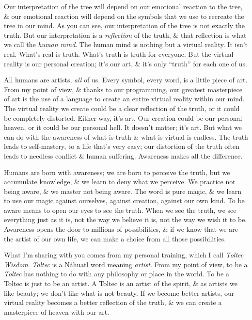 \documentclass{article}
\numberwithin{equation}{section}
\begin{document}
Our interpretation of the tree will depend on our emotional reaction to the tree, \& our emotional reaction will depend on the symbols that we use to recreate the tree in our mind. As you can see, our interpretation of the tree is not exactly the truth. But our interpretation is a \textit{reflection} of the truth, \& that reflection is what we call the \textit{human mind}. The human mind is nothing but a virtual reality. It isn't real. What's real is truth. What's truth is truth for everyone. But the virtual reality is our personal creation; it's our art, \& it's only ``truth'' for each one of us.

All humans are artists, \textit{all} of us. Every symbol, every word, is a little piece of art. From my point of view, \& thanks to our programming, our greatest masterpiece of art is the use of a language to create an entire virtual reality within our mind. The virtual reality we create could be a clear reflection of the truth, or it could be completely distorted. Either way, it's art. Our creation could be our personal heaven, or it could be our personal hell. It doesn't matter; it's art. But what we can do with the awareness of what is truth \& what is virtual is endless. The truth leads to self-mastery, to a life that's very easy; our distortion of the truth often leads to needless conflict \& human suffering. Awareness makes all the difference.

Humans are born with awareness; we are born to perceive the truth, but we accumulate knowledge, \& we learn to deny what we perceive. We practice not being aware, \& we master not being aware. The word is pure magic, \& we learn to use our magic against ourselves, against creation, against our own kind. To be aware means to open our eyes to see the truth. When we see the truth, we see everything just as it is, not the way we believe it is, not the way we wish it to be. Awareness opens the door to millions of possibilities, \& if we know that we are the artist of our own life, we can make a choice from all those possibilities.

What I'm sharing with you comes from my personal training, which I call \textit{Toltec Wisdom}. \textit{Toltec} is a N\'ahuatl word meaning \textit{artist}. From my point of view, to be a \textit{Toltec} has nothing to do with any philosophy or place in the world. To be a Toltec is just to be an artist. A Toltec is an artist of the spirit, \& as artists we like beauty; we don't like what is not beauty. If we become better artists, our virtual reality becomes a better reflection of the truth, \& we can create a masterpiece of heaven with our art.
\end{document}
